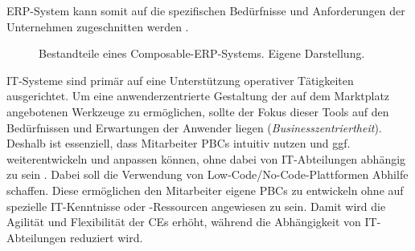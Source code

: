 ERP-System kann somit auf die spezifischen Bedürfnisse und Anforderungen der Unternehmen zugeschnitten werden \cite{.20230313}.
\begin{center}
	\begin{figure}[H]
		\centering
		\caption[Bestandteile eines Composable-ERP-Systems]{Bestandteile eines Composable-ERP-Systems. Eigene Darstellung.}
		\label{fig:CERP}
	\end{figure}	
\end{center}
\vspace*{-15mm}
IT-Systeme sind primär auf eine Unterstützung operativer Tätigkeiten ausgerichtet. Um eine anwenderzentrierte Gestaltung der auf dem Marktplatz angebotenen Werkzeuge zu ermöglichen, sollte der Fokus dieser Tools auf den Bedürfnissen und Erwartungen der Anwender liegen (\textit{Businesszentriertheit}). Deshalb ist essenziell, dass Mitarbeiter PBCs intuitiv nutzen und ggf. weiterentwickeln und anpassen können, ohne dabei von IT-Abteilungen abhängig zu sein \cite{.20230313}. Dabei soll die Verwendung von Low-Code/No-Code-Plattformen Abhilfe schaffen. Diese ermöglichen den Mitarbeiter eigene PBCs zu entwickeln ohne auf spezielle IT-Kenntnisse oder -Ressourcen angewiesen zu sein. Damit wird die Agilität und Flexibilität der CEs erhöht, während die Abhängigkeit von IT-Abteilungen reduziert wird.

